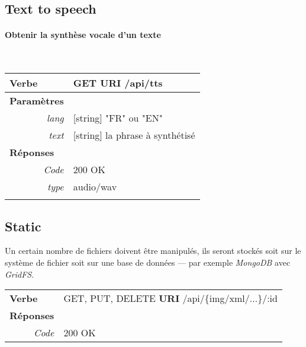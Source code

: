 \begin{appendices}

\begin{absolutelynopagebreak}
\section{Text to speech}

\paragraph{Obtenir la synthèse vocale d'un texte}
~

\begin{tabular}{@{}p{2cm}p{11.5cm}@{}}
    \toprule
    \textbf{Verbe}                        & GET \hspace{2.5cm} \textbf{URI} \hspace{0.25cm} /api/tts   \\ \midrule
    \textbf{Paramètres}                   &        \\
    \multicolumn{1}{r}{\textit{lang}} & [string] "FR" ou "EN"  \\
    \multicolumn{1}{r}{\textit{text}} & [string] la phrase à synthétisé  \\ \midrule
    \textbf{Réponses}                     &        \\
    \multicolumn{1}{r}{\textit{Code}}   & 200 OK \\
    \multicolumn{1}{r}{\textit{type}}   & audio/wav \\
    \\ \bottomrule
\end{tabular}
\end{absolutelynopagebreak}

\begin{absolutelynopagebreak}
\section{Static}
Un certain nombre de fichiers doivent être manipulés, ils seront stockés soit sur le système de fichier soit sur une base de données --- par exemple \emph{MongoDB} avec \emph{GridFS}.

\begin{tabular}{@{}p{2cm}p{11.5cm}@{}}
    \toprule
    \textbf{Verbe}                        & GET, PUT, DELETE \hspace{2.5cm} \textbf{URI} \hspace{0.25cm} /api/\{img/xml/...\}/:id  \\
    \textbf{Réponses}                     &        \\
    \multicolumn{1}{r}{\textit{Code}}   & 200 OK \\ \bottomrule
\end{tabular}
\end{absolutelynopagebreak}


\end{appendices}